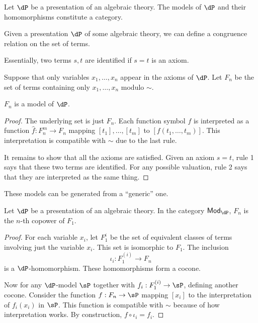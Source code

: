 \documentclass{amsart}
\begin{document}
\begin{lem}
  Let $\dP$ be a presentation of an algebraic theory.
  The models of $\dP$ and their homomorphisms constitute a category.
\end{lem}

Given a presentation $\dP$ of some algebraic theory, we can define a congruence relation on the set of terms.
Essentially, two terms $s,t$ are identified if $s = t$ is an axiom.

Suppose that only variables $x_{1},\ldots,x_{n}$ appear in the axioms of $\dP$.
Let $F_{n}$ be the set of terms containing only $x_{1},\ldots,x_{n}$ modulo $\sim$.

\begin{lem}
  $F_{n}$ is a model of $\dP$.
\end{lem}
\begin{proof}
  The underlying set is just $F_{n}$.
  Each function symbol $f$ is interpreted as a function $\hat{f} : F_{n}^{m} \to F_{n}$ mapping $[t_{1}],\ldots,[t_{m}]$ to $[f(t_{1},\ldots,t_{m})]$.
  This interpretation is compatible with $\sim$ due to the last rule.

  It remains to show that all the axioms are satisfied.
  Given an axiom $s = t$, rule 1 says that these two terms are identified.
  For any possible valuation, rule 2 says that they are interpreted as the same thing.
\end{proof}

These models can be generated from a ``generic'' one.
\begin{lem}
  Let $\dP$ be a presentation of an algebraic theory.
  In the category $\mathsf{Mod}_{\dP}$, $F_{n}$ is the $n$-th copower of $F_{1}$.
\end{lem}
\begin{proof}
  For each variable $x_{i}$, let $F^{i}_{1}$ be the set of equivalent classes of terms involving just the variable $x_{i}$.
  This set is isomorphic to $F_{1}$.
  The inclusion
  \[
    \iota_{i} : F^{(i)}_{1} \to F_{n}
  \]
  is a $\dP$-homomorphism.
  These homomorphisms form a cocone.

  Now for any $\dP$-model $\sP$ together with $f_{i} : F^{(i)}_{1} \to \sP$, defining another cocone.
  Consider the function $f : F_{n} \to \sP$ mapping $[x_{i}]$ to the interpretation of $f_{i}(x_{i})$ in $\sP$.
  This function is compatible with $\sim$ because of how interpretation works.
  By construction, $f \circ \iota_{i} = f_{i}$.
\end{proof}
\end{document}
